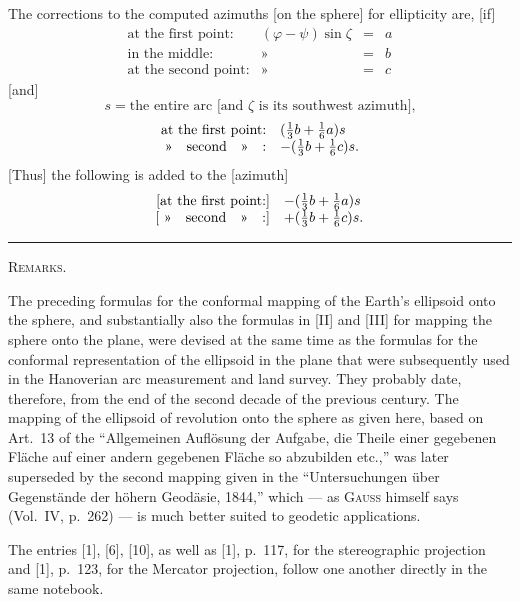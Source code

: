 The corrections to the computed azimuths [on the sphere] for ellipticity are, [if]
\[
\begin{array}{rccl}
\text{at the first point:}&(\varphi-\psi)\sin\zeta&=&a\\
\text{in the middle:}&\text{»}&=&b\\
\text{at the second point:}&\text{»}&=&c
\end{array}
\]
[and]
\[
s=\text{the entire arc [and $\zeta$ is its southwest azimuth],}
\]
\[
\begin{array}{rl}
\text{at the first point:}&(\tfrac13b+\tfrac16a)s\\
\text{»\quad second\quad »\quad :}&-(\tfrac13b+\tfrac16c)s.
\end{array}
\]
[Thus] the following is added to the  [azimuth]
\[
\begin{array}{rl}
\text{[at the first point:]}&-(\tfrac13b+\tfrac16a)s\\
\text{[ »\quad second\quad »\quad :]}&+(\tfrac13b+\tfrac16c)s.
\end{array}
\]
\begin{center}\rule{.18\textwidth}{.4pt}\par\vspace{12mm}\textsc{Remarks.}\end{center}
\begingroup\small
The preceding formulas for the conformal mapping of the Earth's ellipsoid onto the sphere, and substantially also the formulas in [II] and [III] for mapping the sphere onto the plane, were devised at the same time as the formulas for the conformal representation of the ellipsoid in the plane that were subsequently used in the Hanoverian arc measurement and land survey. They probably date, therefore, from the end of the second decade of the previous century. The mapping of the ellipsoid of revolution onto the sphere as given here, based on Art.~13 of the “Allgemeinen Auflösung der Aufgabe, die Theile einer gegebenen Fläche auf einer andern gegebenen Fläche so abzubilden etc.,” was later superseded by the second mapping given in the “Untersuchungen über Gegenstände der höhern Geodäsie, 1844,” which --- as \textsc{Gauss} himself says (Vol.~IV, p.~262) --- is much better suited to geodetic applications.

The entries [1], [6], [10], as well as [1], p.~117, for the stereographic projection and [1], p.~123, for the Mercator projection, follow one another directly in the same notebook.

